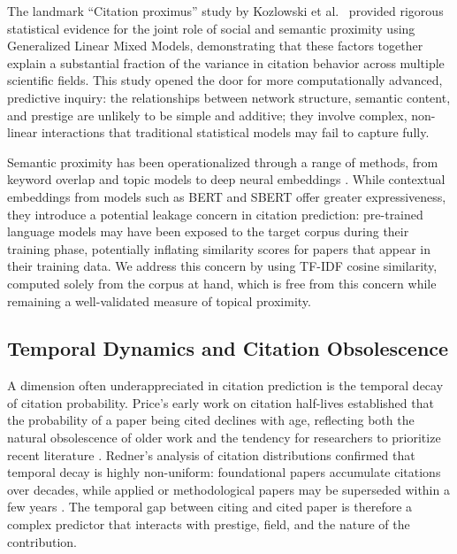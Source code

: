 \documentclass[12pt,a4paper]{article}
\begin{document}
The landmark ``Citation proximus'' study by Kozlowski et al.\ \citep{kozlowski2025citation}
provided rigorous statistical evidence for the joint role of social and semantic
proximity using Generalized Linear Mixed Models, demonstrating that these factors
together explain a substantial fraction of the variance in citation behavior across
multiple scientific fields. This study opened the door for more computationally
advanced, predictive inquiry: the relationships between network structure, semantic
content, and prestige are unlikely to be simple and additive; they involve complex,
non-linear interactions that traditional statistical models may fail to capture fully.

Semantic proximity has been operationalized through a range of methods, from
keyword overlap and topic models \citep{blei2003latent} to deep neural embeddings
\citep{devlin2019bert, reimers2019sentence}. While contextual embeddings from
models such as BERT and SBERT offer greater expressiveness, they introduce a
potential leakage concern in citation prediction: pre-trained language models may
have been exposed to the target corpus during their training phase, potentially
inflating similarity scores for papers that appear in their training data. We
address this concern by using TF-IDF cosine similarity, computed solely from the
corpus at hand, which is free from this concern while remaining a well-validated
measure of topical proximity.

\subsection{Temporal Dynamics and Citation Obsolescence}

A dimension often underappreciated in citation prediction is the temporal decay
of citation probability. Price's early work on citation half-lives established
that the probability of a paper being cited declines with age, reflecting both
the natural obsolescence of older work and the tendency for researchers to
prioritize recent literature \citep{de1976general}. Redner's analysis of citation
distributions confirmed that temporal decay is highly non-uniform: foundational
papers accumulate citations over decades, while applied or methodological papers
may be superseded within a few years \citep{redner2005citation}. The temporal gap
between citing and cited paper is therefore a complex predictor that interacts
with prestige, field, and the nature of the contribution.
\end{document}

